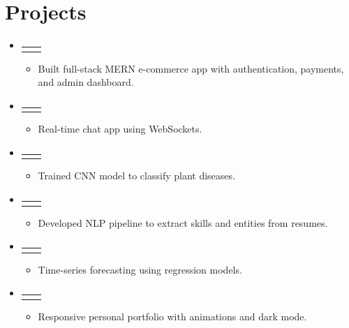 \documentclass[a4paper,10pt]{article}
\makeatletter
\newcommand{\resumeItem}[1]{
  \item\small{#1 \vspace{-2pt}}
}
\newcommand{\resumeProjectHeading}[2]{
  \vspace{-1pt}\item
    \begin{tabular*}{0.97\textwidth}{l@{\extracolsep{\fill}}r}
      \textbf{#1} & \textit{\small#2} \\
    \end{tabular*}\vspace{-5pt}
}
\newcommand{\resumeSubHeadingListStart}{\begin{itemize}[leftmargin=0.15in, label={}]}
\newcommand{\resumeSubHeadingListEnd}{\end{itemize}}
\newcommand{\resumeItemListStart}{\begin{itemize}[leftmargin=0.2in]}
\newcommand{\resumeItemListEnd}{\end{itemize}\vspace{-5pt}}
\makeatother
\begin{document}
\section{Projects}
\resumeSubHeadingListStart
  \resumeProjectHeading
    {}{}
        \resumeItemListStart
            \resumeItem{Built full-stack MERN e-commerce app with authentication, payments, and admin dashboard.}
          \resumeItemListEnd
      \resumeProjectHeading
    {}{}
        \resumeItemListStart
            \resumeItem{Real-time chat app using WebSockets.}
          \resumeItemListEnd
      \resumeProjectHeading
    {}{}
        \resumeItemListStart
            \resumeItem{Trained CNN model to classify plant diseases.}
          \resumeItemListEnd
      \resumeProjectHeading
    {}{}
        \resumeItemListStart
            \resumeItem{Developed NLP pipeline to extract skills and entities from resumes.}
          \resumeItemListEnd
      \resumeProjectHeading
    {}{}
        \resumeItemListStart
            \resumeItem{Time-series forecasting using regression models.}
          \resumeItemListEnd
      \resumeProjectHeading
    {}{}
        \resumeItemListStart
            \resumeItem{Responsive personal portfolio with animations and dark mode.}
          \resumeItemListEnd
    \resumeSubHeadingListEnd
\vspace{4pt}


\end{document}
